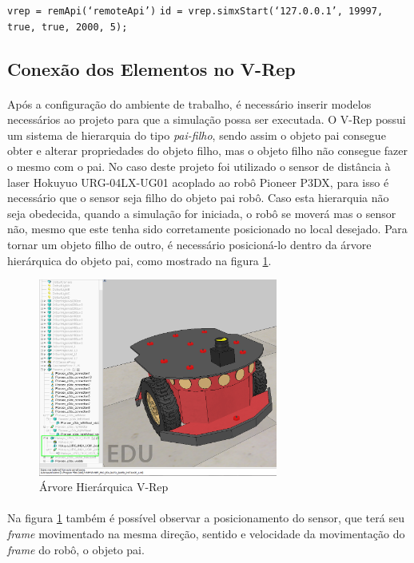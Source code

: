 \begin{flushleft}
	\texttt{vrep = remApi(\lq{remoteApi}\rq)} \newline
	\texttt{id = vrep.simxStart(\lq{127.0.0.1}\rq, 19997, true, true, 2000, 5);}
\end{flushleft}

\subsection{Conexão dos Elementos no V-Rep}

\paragraph{}
Após a configuração do ambiente de trabalho, é necessário inserir modelos necessários ao projeto para que a simulação possa ser executada. O V-Rep possui um sistema de hierarquia do tipo \emph{pai-filho}, sendo assim o objeto pai consegue obter e alterar propriedades do objeto filho, mas o objeto filho não consegue fazer o mesmo com o pai. No caso deste projeto foi utilizado o sensor de distância à laser Hokuyuo URG-04LX-UG01 acoplado ao robô Pioneer P3DX, para isso é necessário que o sensor seja filho do objeto pai robô. Caso esta hierarquia não seja obedecida, quando a simulação for iniciada, o robô se moverá mas o sensor não, mesmo que este tenha sido corretamente posicionado no local desejado. Para tornar um objeto filho de outro, é necessário posicioná-lo dentro da árvore hierárquica do objeto pai, como mostrado na figura \ref{fig:arvore-v-rep}.
	
\begin{figure}[h]
	\centering
	\includegraphics[width=0.7\textwidth]{imagens/insercao_elementos_vrep}
	\caption{Árvore Hierárquica V-Rep}
	\label{fig:arvore-v-rep}
\end{figure}

\paragraph{}
Na figura \ref{fig:arvore-v-rep} também é possível observar a posicionamento do sensor, que terá seu \emph{frame} movimentado na mesma direção, sentido e velocidade da movimentação do \emph{frame} do robô, o objeto pai.



